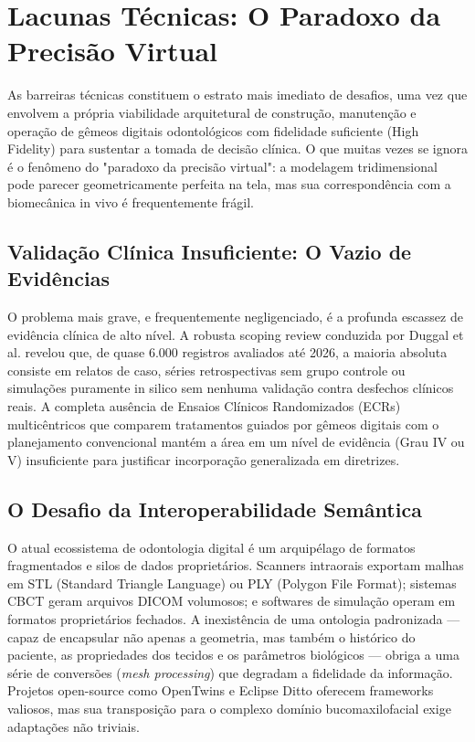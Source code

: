 \section{Lacunas Técnicas: O Paradoxo da Precisão Virtual}

As barreiras técnicas constituem o estrato mais imediato de desafios, uma vez que envolvem a própria viabilidade arquitetural de construção, manutenção e operação de gêmeos digitais odontológicos com fidelidade suficiente (High Fidelity) para sustentar a tomada de decisão clínica. O que muitas vezes se ignora é o fenômeno do "paradoxo da precisão virtual": a modelagem tridimensional pode parecer geometricamente perfeita na tela, mas sua correspondência com a biomecânica in vivo é frequentemente frágil.

\subsection{Validação Clínica Insuficiente: O Vazio de Evidências}

O problema mais grave, e frequentemente negligenciado, é a profunda escassez de evidência clínica de alto nível. A robusta scoping review conduzida por Duggal et al. \cite{duggal2026exploring} revelou que, de quase 6.000 registros avaliados até 2026, a maioria absoluta consiste em relatos de caso, séries retrospectivas sem grupo controle ou simulações puramente in silico sem nenhuma validação contra desfechos clínicos reais. A completa ausência de Ensaios Clínicos Randomizados (ECRs) multicêntricos que comparem tratamentos guiados por gêmeos digitais com o planejamento convencional mantém a área em um nível de evidência (Grau IV ou V) insuficiente para justificar incorporação generalizada em diretrizes.

\subsection{O Desafio da Interoperabilidade Semântica}

O atual ecossistema de odontologia digital é um arquipélago de formatos fragmentados e silos de dados proprietários. Scanners intraorais exportam malhas em STL (Standard Triangle Language) ou PLY (Polygon File Format); sistemas CBCT geram arquivos DICOM volumosos; e softwares de simulação operam em formatos proprietários fechados. A inexistência de uma ontologia padronizada — capaz de encapsular não apenas a geometria, mas também o histórico do paciente, as propriedades dos tecidos e os parâmetros biológicos — obriga a uma série de conversões (\textit{mesh processing}) que degradam a fidelidade da informação. Projetos open-source como OpenTwins \cite{robles2023opentwins} e Eclipse Ditto \cite{eclipse2024ditto} oferecem frameworks valiosos, mas sua transposição para o complexo domínio bucomaxilofacial exige adaptações não triviais.


